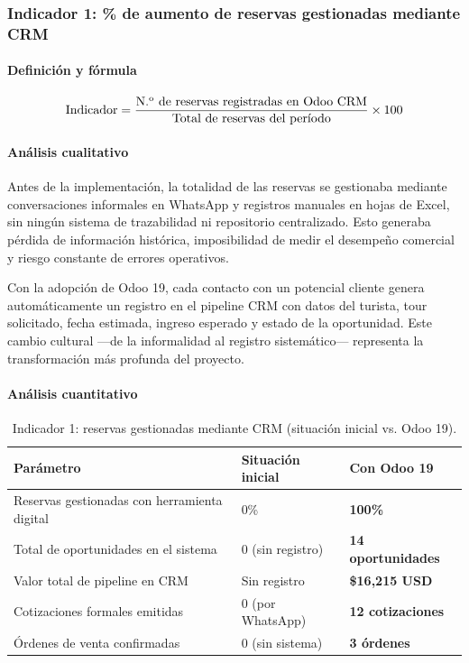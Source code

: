 \subsubsection{Indicador 1: \% de aumento de reservas gestionadas mediante CRM}

\paragraph{Definición y fórmula}
\[
\text{Indicador} = \frac{\text{N.\textsuperscript{o} de reservas registradas en Odoo CRM}}{\text{Total de reservas del per\'{i}odo}} \times 100
\]

\paragraph{Análisis cualitativo}
Antes de la implementación, la totalidad de las reservas se gestionaba mediante conversaciones informales en WhatsApp y registros manuales en hojas de Excel, sin ningún sistema de trazabilidad ni repositorio centralizado. Esto generaba pérdida de información histórica, imposibilidad de medir el desempeño comercial y riesgo constante de errores operativos.

Con la adopción de Odoo 19, cada contacto con un potencial cliente genera automáticamente un registro en el pipeline CRM con datos del turista, tour solicitado, fecha estimada, ingreso esperado y estado de la oportunidad. Este cambio cultural —de la informalidad al registro sistemático— representa la transformación más profunda del proyecto.

\paragraph{Análisis cuantitativo}
\begin{table}[htbp]
\centering
\renewcommand{\arraystretch}{1.3}
\begin{tabular}{|p{4.5cm}|p{3.5cm}|p{3.5cm}|}
\hline
\textbf{Parámetro} & \textbf{Situación inicial} & \textbf{Con Odoo 19} \\ \hline
Reservas gestionadas con herramienta digital & 0\% & \textbf{100\%} \\ \hline
Total de oportunidades en el sistema & 0 (sin registro) & \textbf{14 oportunidades} \\ \hline
Valor total de pipeline en CRM & Sin registro & \textbf{\$16,215 USD} \\ \hline
Cotizaciones formales emitidas & 0 (por WhatsApp) & \textbf{12 cotizaciones} \\ \hline
Órdenes de venta confirmadas & 0 (sin sistema) & \textbf{3 órdenes} \\ \hline
\end{tabular}
\caption{Indicador 1: reservas gestionadas mediante CRM (situación inicial vs. Odoo 19).}
\end{table}

